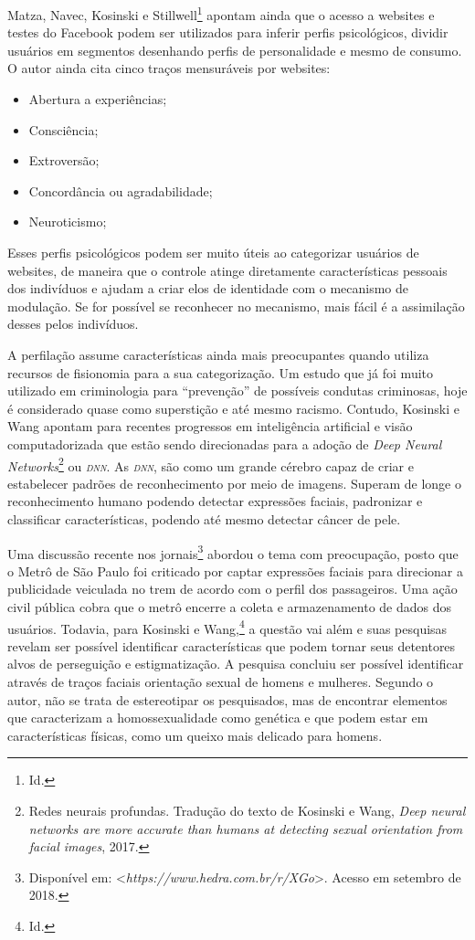 Matza, Navec, Kosinski e Stillwell\footnote{Id.} apontam ainda que o acesso a
websites e testes do Facebook podem ser utilizados para inferir perfis
psicológicos, dividir usuários em segmentos desenhando perfis de
personalidade e mesmo de consumo. O autor ainda cita cinco traços
mensuráveis por websites:

\begin{itemize}
\item
  Abertura a experiências;
\item
  Consciência;
\item
  Extroversão;
\item
  Concordância ou agradabilidade;
\item
  Neuroticismo;
\end{itemize}

Esses perfis psicológicos podem ser muito úteis ao categorizar usuários
de websites, de maneira que o controle atinge diretamente
características pessoais dos indivíduos e ajudam a criar elos de
identidade com o mecanismo de modulação. Se for possível se reconhecer
no mecanismo, mais fácil é a assimilação desses pelos indivíduos.

A perfilação assume características ainda mais preocupantes quando
utiliza recursos de fisionomia para a sua categorização. Um estudo que
já foi muito utilizado em criminologia para ``prevenção'' de possíveis
condutas criminosas, hoje é considerado quase como superstição e até
mesmo racismo. Contudo, Kosinski e Wang apontam para recentes
progressos em inteligência artificial e visão computadorizada que estão
sendo direcionadas para a adoção de \emph{Deep Neural
Networks}\footnote{Redes neurais profundas. Tradução do texto de
  Kosinski e Wang, \emph{Deep neural networks are more accurate than humans at detecting sexual orientation from facial images}, 2017.} ou \emph{\textsc{dnn}}. As \emph{\textsc{dnn}}, são como um
grande cérebro capaz de criar e estabelecer padrões de reconhecimento
por meio de imagens. Superam de longe o reconhecimento humano podendo
detectar expressões faciais, padronizar e classificar características,
podendo até mesmo detectar câncer de pele.

Uma discussão recente nos jornais\footnote{Disponível em:
\textless{}\emph{https://www.hedra.com.br/r/XGo}\textgreater{}. Acesso em setembro de 2018.} abordou o tema com preocupação, posto que
o Metrô de São Paulo foi criticado por captar expressões faciais para
direcionar a publicidade veiculada no trem de acordo com o perfil dos
passageiros. Uma ação civil pública cobra que o metrô encerre a coleta e
armazenamento de dados dos usuários. Todavia, para Kosinski e Wang,\footnote{Id.}
a questão vai além e suas pesquisas revelam ser possível identificar
características que podem tornar seus detentores alvos de perseguição e
estigmatização. A pesquisa concluiu ser possível identificar através de
traços faciais orientação sexual de homens e mulheres. Segundo o autor,
não se trata de estereotipar os pesquisados, mas de encontrar elementos
que caracterizam a homossexualidade como genética e que podem estar em
características físicas, como um queixo mais delicado para homens.

